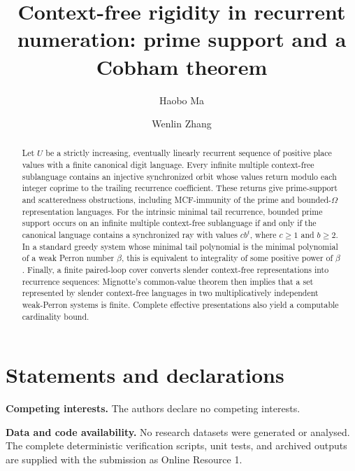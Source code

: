 \documentclass[11pt,a4paper]{amsart}
\title[Context-free rigidity in recurrent numeration]{Context-free rigidity in recurrent numeration: prime support and a Cobham theorem}
\author{Haobo Ma}
\author{Wenlin Zhang}
\date{}
\begin{document}
\begin{abstract}
Let \(U\) be a strictly increasing, eventually linearly recurrent sequence
of positive place values with a finite canonical digit language. Every
infinite multiple context-free sublanguage contains an injective
synchronized orbit whose values return modulo each integer coprime to the
trailing recurrence coefficient. These returns give prime-support and
scatteredness obstructions, including MCF-immunity of the prime and
bounded-\(\Omega\) representation languages. For the intrinsic minimal
tail recurrence, bounded prime support occurs on an infinite
multiple context-free sublanguage if and only if the canonical language
contains a synchronized ray with values \(cb^t\), where \(c\ge1\) and
\(b\ge2\). In a standard greedy system whose minimal tail polynomial is
the minimal polynomial of a weak Perron number \(\beta\), this is equivalent
to integrality of some positive power of \(\beta\). Finally, a finite
paired-loop cover converts slender context-free representations into
recurrence sequences: Mignotte's common-value theorem then implies that a
set represented by slender context-free languages in two multiplicatively
independent weak-Perron systems is finite. Complete effective presentations
also yield a computable cardinality bound.
\end{abstract}


\maketitle






\section*{Statements and declarations}

\textbf{Competing interests.} The authors declare no competing interests.

\textbf{Data and code availability.} No research datasets were generated or
analysed. The complete deterministic verification scripts, unit tests, and
archived outputs are supplied with the submission as Online Resource 1.


\end{document}
